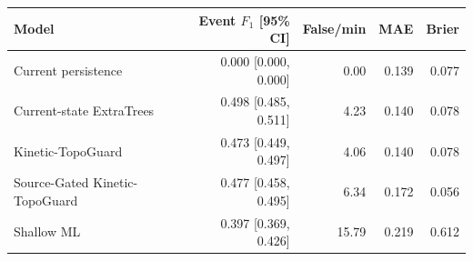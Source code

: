 \begin{tabular}{lrrrr}
\toprule
Model & Event $F_1$ [95\% CI] & False/min & MAE & Brier \\
\midrule
Current persistence & 0.000 [0.000, 0.000] & 0.00 & 0.139 & 0.077 \\
Current-state ExtraTrees & 0.498 [0.485, 0.511] & 4.23 & 0.140 & 0.078 \\
Kinetic-TopoGuard & 0.473 [0.449, 0.497] & 4.06 & 0.140 & 0.078 \\
Source-Gated Kinetic-TopoGuard & 0.477 [0.458, 0.495] & 6.34 & 0.172 & 0.056 \\
Shallow ML & 0.397 [0.369, 0.426] & 15.79 & 0.219 & 0.612 \\
\bottomrule
\end{tabular}
